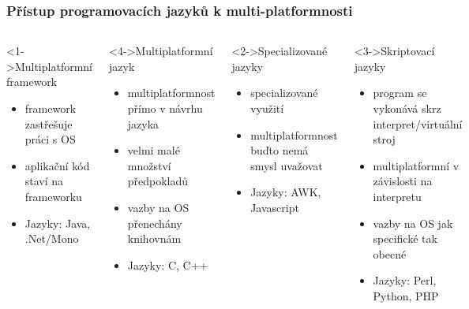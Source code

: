 \begin{frame}
	\frametitle{Přístup programovacích jazyků k multi-platformnosti}

\begin{columns}
	\begin{block}<1->{Multiplatformní framework}
	\scriptsize
		\begin{itemize}
			\item{framework zastřešuje práci s OS}
			\item{aplikační kód staví na frameworku}
			\item{Jazyky: Java, .Net/Mono}
		\end{itemize}
	\end{block}
	\begin{block}<4->{Multiplatformní jazyk}
	\scriptsize
		\begin{itemize}
			\item{multiplatformnost přímo v návrhu jazyka}
			\item{velmi malé množství předpokladů}
			\item{vazby na OS přenechány knihovnám}
			\item{Jazyky: C, C++}
		\end{itemize}
	\end{block}
	\begin{block}<2->{Specializované jazyky}
	\scriptsize
		\begin{itemize}
			\item{specializované využití}
			\item{multiplatformnost buďto nemá smysl uvažovat}
			\item{Jazyky: AWK, Javascript}
		\end{itemize}
	\end{block}
	\begin{block}<3->{Skriptovací jazyky}
	\scriptsize
		\begin{itemize}
			\item{program se vykonává skrz interpret/virtuální stroj}
			\item{multiplatformní v závislosti na interpretu}
			\item{vazby na OS jak specifické tak obecné}
			\item{Jazyky: Perl, Python, PHP}
		\end{itemize}
	\end{block}
\end{columns}

\end{frame}

